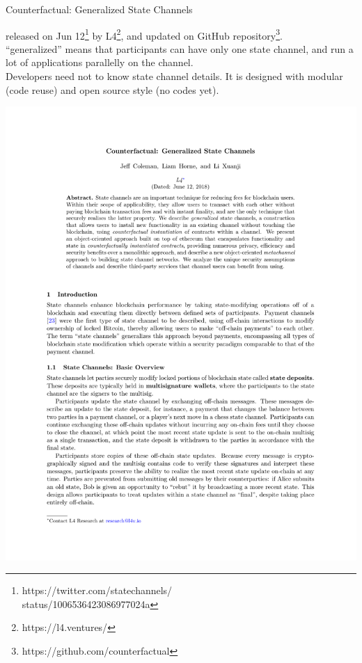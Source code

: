 \documentclass{beamer}
\begin{document}
\begin{frame}{Counterfactual: Generalized State Channels}
\begin{minipage}{0.45\textwidth}
\fontsize{9}{10.8}\selectfont
\vspace{10pt}
released on Jun 12\footnote{https://twitter.com/statechannels/\\status/1006536423086977024a} by L4\footnote{https://l4.ventures/}, and updated on GitHub repository\footnote{https://github.com/counterfactual}.\\
``generalized'' means that participants can have only one state channel, and run a lot of applications parallelly on the channel.\\
Developers need not to know state channel details. It is designed with modular (code reuse) and open source style (no codes yet).
\end{minipage}
\begin{minipage}{0.40\textwidth}%
\includegraphics[page=1,scale=0.35,trim=-380 0 0 600]{statechannels.pdf}%
\end{minipage}
\end{frame}
\end{document}
